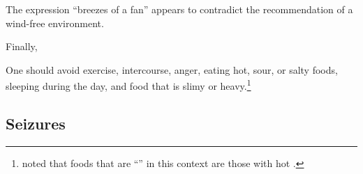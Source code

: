 \begin{translation}
\begin{sloka}
{           The expression  “breezes of a fan” appears to
           contradict the recommendation of a wind-free
           environment.}
\end{sloka}

\newpage

\item[17]

Finally,
\begin{sloka}
    One should avoid exercise, intercourse, anger, eating hot, sour,
or salty foods, sleeping during the day, and food that is slimy or
heavy.\footnote{ noted that foods that are
    “” in this context are those with hot
    .}
\end{sloka}

\subsection{Seizures}

\item[18]


\end{translation}
